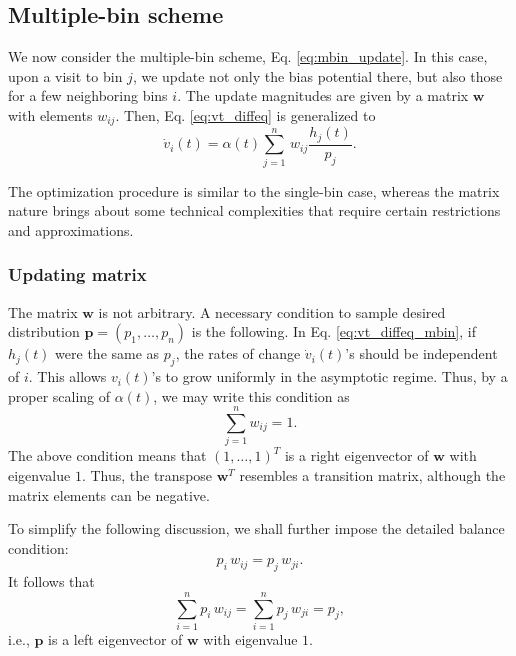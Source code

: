 \documentclass[reprint]{revtex4-1}
\begin{document}
\subsection{\label{sec:multiple-bin}
Multiple-bin scheme}



We now consider the multiple-bin scheme,
Eq. \eqref{eq:mbin_update}.
%
In this case,
upon a visit to bin $j$,
we update not only the bias potential there,
but also those for a few neighboring bins $i$.
%
The update magnitudes are given by a matrix $\mathbf w$
with elements $w_{ij}$.
%
Then, Eq. \eqref{eq:vt_diffeq} is generalized to
\begin{equation}
  \dot v_i(t)
  =
  \alpha(t) \sum_{j=1}^n \, w_{ij} \frac{ h_j(t) } { p_j }.
  \label{eq:vt_diffeq_mbin}
\end{equation}


The optimization procedure is similar to the single-bin case,
whereas the matrix nature brings about
some technical complexities that require
certain restrictions and approximations.



\subsubsection{\label{sec:updating-matrix}
Updating matrix}



The matrix $\mathbf w$ is not arbitrary.
%
A necessary condition to sample desired distribution
$\mathbf p = (p_1, \dots, p_n)$
is the following.
%
In Eq. \eqref{eq:vt_diffeq_mbin},
if $h_j(t)$ were the same as $p_j$,
the rates of change $\dot v_i(t)$'s
should be independent of $i$.
%
This allows $v_i(t)$'s to grow uniformly
in the asymptotic regime.
%
Thus, by a proper scaling of $\alpha(t)$,
we may write this condition as
%
\begin{equation}
  \sum_{j = 1}^n w_{ij} = 1.
  \label{eq:w_sumj}
\end{equation}
%
The above condition means that $(1, \dots, 1)^T$
is a right eigenvector of $\mathbf w$
with eigenvalue $1$.
%
Thus, the transpose $\mathbf w^T$
resembles a transition matrix,
although the matrix elements can be negative.



To simplify the following discussion,
we shall further impose the
detailed balance condition:
%
\begin{equation}
  p_i \, w_{ij} = p_j \, w_{ji}.
  \label{eq:w_detailedbalance}
\end{equation}
%
It follows that
\begin{equation}
  \sum_{i = 1}^n p_i \, w_{ij}
  =
  \sum_{i = 1}^n p_j \, w_{ji}
  = p_j,
  \label{eq:w_balance}
\end{equation}
%
i.e., $\mathbf p$ is a left eigenvector of
$\mathbf w$ with eigenvalue $1$.
\end{document}

